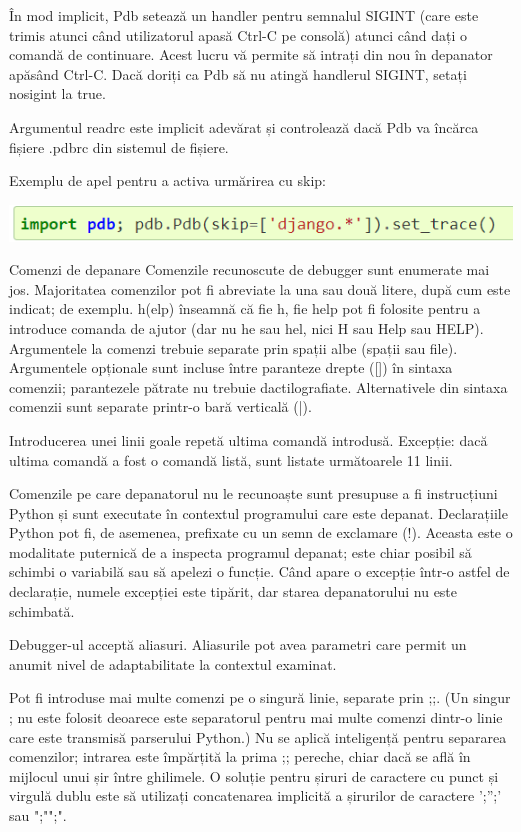 \documentclass[oneside,20pt]{article}          %
\begin{document}
În mod implicit, Pdb setează un handler pentru semnalul SIGINT (care este trimis atunci când utilizatorul apasă Ctrl-C pe consolă) atunci când dați o comandă de continuare. Acest lucru vă permite să intrați din nou în depanator apăsând Ctrl-C. Dacă doriți ca Pdb să nu atingă handlerul SIGINT, setați nosigint la true.

Argumentul readrc este implicit adevărat și controlează dacă Pdb va încărca fișiere .pdbrc din sistemul de fișiere.

Exemplu de apel pentru a activa urmărirea cu skip:
\begin{center}
\includegraphics[height = 1 cm]{5.png}
\end{center}
Comenzi de depanare
Comenzile recunoscute de debugger sunt enumerate mai jos. Majoritatea comenzilor pot fi abreviate la una sau două litere, după cum este indicat; de exemplu. h(elp) înseamnă că fie h, fie help pot fi folosite pentru a introduce comanda de ajutor (dar nu he sau hel, nici H sau Help sau HELP). Argumentele la comenzi trebuie separate prin spații albe (spații sau file). Argumentele opționale sunt incluse între paranteze drepte ([]) în sintaxa comenzii; parantezele pătrate nu trebuie dactilografiate. Alternativele din sintaxa comenzii sunt separate printr-o bară verticală (|).

Introducerea unei linii goale repetă ultima comandă introdusă. Excepție: dacă ultima comandă a fost o comandă listă, sunt listate următoarele 11 linii.

Comenzile pe care depanatorul nu le recunoaște sunt presupuse a fi instrucțiuni Python și sunt executate în contextul programului care este depanat. Declarațiile Python pot fi, de asemenea, prefixate cu un semn de exclamare (!). Aceasta este o modalitate puternică de a inspecta programul depanat; este chiar posibil să schimbi o variabilă sau să apelezi o funcție. Când apare o excepție într-o astfel de declarație, numele excepției este tipărit, dar starea depanatorului nu este schimbată.

Debugger-ul acceptă aliasuri. Aliasurile pot avea parametri care permit un anumit nivel de adaptabilitate la contextul examinat.

Pot fi introduse mai multe comenzi pe o singură linie, separate prin ;;. (Un singur ; nu este folosit deoarece este separatorul pentru mai multe comenzi dintr-o linie care este transmisă parserului Python.) Nu se aplică inteligență pentru separarea comenzilor; intrarea este împărțită la prima ;; pereche, chiar dacă se află în mijlocul unui șir între ghilimele. O soluție pentru șiruri de caractere cu punct și virgulă dublu este să utilizați concatenarea implicită a șirurilor de caractere ';'';' sau ";"";".
\end{document}
